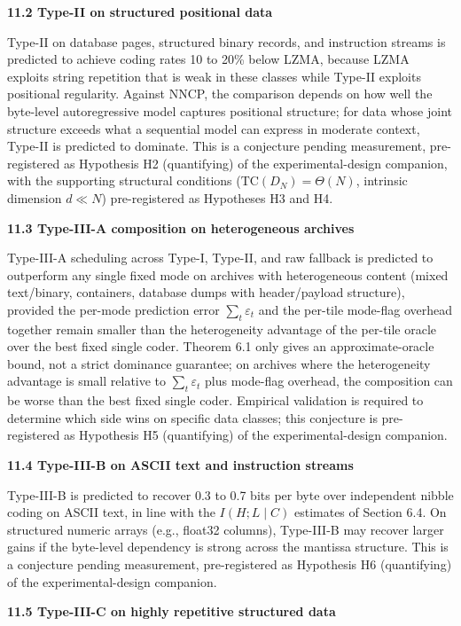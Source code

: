 \documentclass[
]{article}
\begin{document}
\textbf{11.2 Type-II on structured positional data}

Type-II on database pages, structured binary records, and instruction
streams is predicted to achieve coding rates 10 to 20\% below LZMA,
because LZMA exploits string repetition that is weak in these classes
while Type-II exploits positional regularity. Against NNCP, the
comparison depends on how well the byte-level autoregressive model
captures positional structure; for data whose joint structure exceeds
what a sequential model can express in moderate context, Type-II is
predicted to dominate. This is a conjecture pending measurement,
pre-registered as Hypothesis H2 (quantifying) of the experimental-design
companion, with the supporting structural conditions ($\mathrm{TC}(D_N)
= \Theta(N)$, intrinsic dimension $d \ll N$) pre-registered as
Hypotheses H3 and H4.

\textbf{11.3 Type-III-A composition on heterogeneous archives}

Type-III-A scheduling across Type-I, Type-II, and raw fallback is
predicted to outperform any single fixed mode on archives with
heterogeneous content (mixed text/binary, containers, database
dumps with header/payload structure), provided the per-mode
prediction error $\sum_t \varepsilon_t$ and the per-tile mode-flag
overhead together remain smaller than the heterogeneity advantage
of the per-tile oracle over the best fixed single coder.
Theorem 6.1 only gives an approximate-oracle bound, not a strict
dominance guarantee; on archives where the heterogeneity advantage
is small relative to $\sum_t \varepsilon_t$ plus mode-flag
overhead, the composition can be worse than the best fixed single
coder. Empirical validation is required to determine which side
wins on specific data classes; this conjecture is pre-registered as
Hypothesis H5 (quantifying) of the experimental-design companion.

\textbf{11.4 Type-III-B on ASCII text and instruction streams}

Type-III-B is predicted to recover 0.3 to 0.7 bits per byte over
independent nibble coding on ASCII text, in line with the
$I(H ; L \mid C)$ estimates of Section 6.4. On structured numeric
arrays (e.g., float32 columns), Type-III-B may recover larger gains
if the byte-level dependency is strong across the mantissa structure.
This is a conjecture pending measurement, pre-registered as Hypothesis
H6 (quantifying) of the experimental-design companion.

\textbf{11.5 Type-III-C on highly repetitive structured data}
\end{document}
